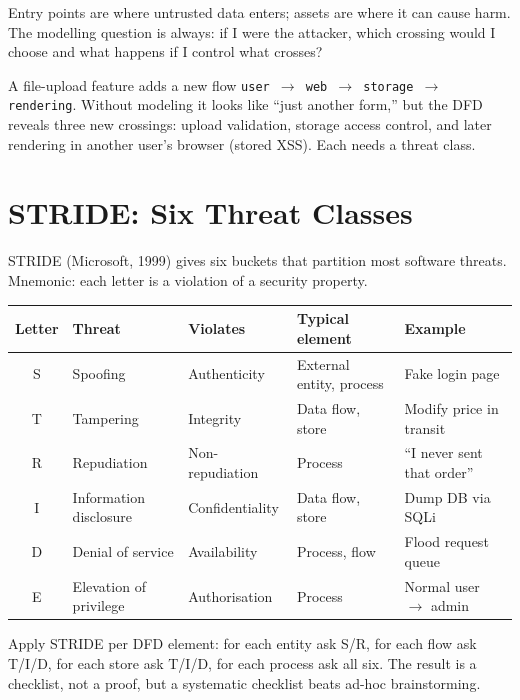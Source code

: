 Entry points are where untrusted data enters; assets are where it can cause harm. The modelling question is always: if I were the attacker, which crossing would I choose and what happens if I control what crosses?

\begin{example}
A file-upload feature adds a new flow \texttt{user $\to$ web $\to$ storage $\to$ rendering}. Without modeling it looks like ``just another form,'' but the DFD reveals three new crossings: upload validation, storage access control, and later rendering in another user's browser (stored XSS). Each needs a threat class.
\end{example}

\section{STRIDE: Six Threat Classes}
\label{sec:stride}
STRIDE (Microsoft, 1999) gives six buckets that partition most software threats. Mnemonic: each letter is a violation of a security property.

\begin{center}
\small
\begin{tabular}{cllll}
\toprule
Letter & Threat & Violates & Typical element & Example \\
\midrule
S & Spoofing & Authenticity & External entity, process & Fake login page \\
T & Tampering & Integrity & Data flow, store & Modify price in transit \\
R & Repudiation & Non-repudiation & Process & ``I never sent that order'' \\
I & Information disclosure & Confidentiality & Data flow, store & Dump DB via SQLi \\
D & Denial of service & Availability & Process, flow & Flood request queue \\
E & Elevation of privilege & Authorisation & Process & Normal user $\to$ admin \\
\bottomrule
\end{tabular}
\end{center}

Apply STRIDE per DFD element: for each entity ask S/R, for each flow ask T/I/D, for each store ask T/I/D, for each process ask all six. The result is a checklist, not a proof, but a systematic checklist beats ad-hoc brainstorming.

